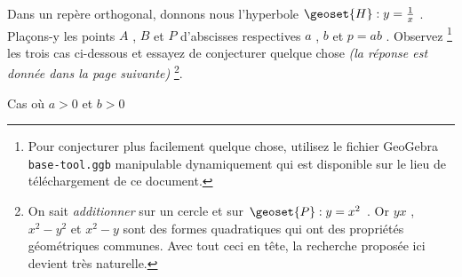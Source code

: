Dans un repère orthogonal, donnons nous l'hyperbole $\geoset{H} : y = \frac{1}{x}$ . Plaçons-y les points $A$ , $B$ et $P$ d'abscisses respectives $a$ , $b$ et  $p = ab$ .
Observez
\footnote{
	Pour conjecturer plus facilement quelque chose, utilisez le fichier GeoGebra \texttt{base-tool.ggb} manipulable dynamiquement qui est disponible sur le lieu de téléchargement de ce document.
}
les trois cas ci-dessous et essayez de conjecturer quelque chose \emph{(la réponse est donnée dans la page suivante)}
\footnote{
	On sait \emph{\og additionner \fg} sur un cercle et sur $\geoset{P} : y = x^2$ .
	Or $yx$ , $x^2 - y^2$ et $x^2 - y$ sont des formes quadratiques qui ont des propriétés géométriques communes.
	Avec tout ceci en tête, la recherche proposée ici devient très naturelle.
}.


\begin{center}
	\footnotesize
	\itshape

	
	\smallskip
	Cas où $a > 0$ et $b > 0$

	\medskip
	
	

\end{center}
